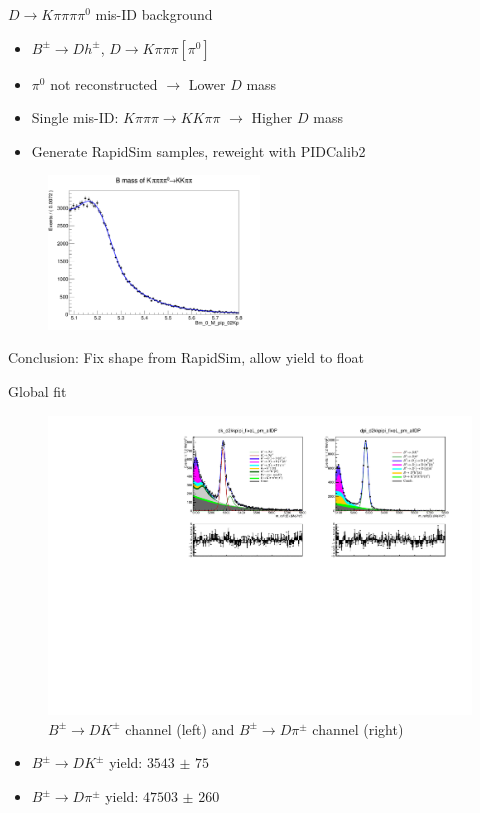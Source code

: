 \documentclass{beamer}
\begin{document}
\begin{frame}{$D\to K\pi\pi\pi\pi^0$ mis-ID background}
  \begin{itemize}
    \setlength\itemsep{0.5em}
    \item{$B^\pm\to Dh^\pm$, $D\to K\pi\pi\pi[\pi^0]$}
    \item{$\pi^0$ not reconstructed $\to$ Lower $D$ mass}
    \item{Single mis-ID: $K\pi\pi\pi\to KK\pi\pi$ $\to$ Higher $D$ mass}
    \item{Generate RapidSim samples, reweight with PIDCalib2}
  \end{itemize}
  \begin{figure}
    \includegraphics[width = 0.5\textwidth]{Plots/Kpipipipi0BMassB2DpiD2Kpipipi.png}
  \end{figure}
  \begin{center}
    Conclusion: Fix shape from RapidSim, allow yield to float
  \end{center}
\end{frame}

\begin{frame}{Global fit}
  \begin{figure}
    \centering
    \includegraphics[width = 1.0\textwidth]{Plots/d2kkpipi_fiveL_allDP.pdf}
    \caption{$B^\pm\to DK^\pm$ channel (left) and $B^\pm\to D\pi^\pm$ channel (right)}
  \end{figure}
  \vspace{-0.5cm}
  \begin{itemize}
    \item{$B^\pm\to DK^\pm$ yield: $\SI{3543(75)}{}$}
    \item{$B^\pm\to D\pi^\pm$ yield: $\SI{47503(260)}{}$}
  \end{itemize}
\end{frame}
\end{document}
